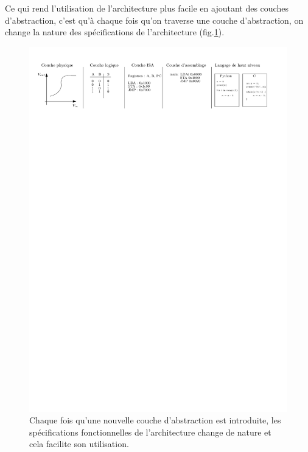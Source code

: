 Ce qui rend l'utilisation de l'architecture plus facile en ajoutant des couches d'abstraction, c'est qu'à chaque fois qu'on traverse une couche d'abstraction, on change la nature des spécifications de l'architecture (fig.\ref{fig:couches_architecture_specif}). 

\begin{figure}[htbp]
\centering\includegraphics[width=\linewidth]{Figs/couches_architecture_specif.pdf}
\caption{\label{fig:couches_architecture_specif} Chaque fois qu'une nouvelle couche d'abstraction est introduite, les spécifications fonctionnelles de l'architecture change de nature et cela facilite son utilisation.}
\end{figure}

